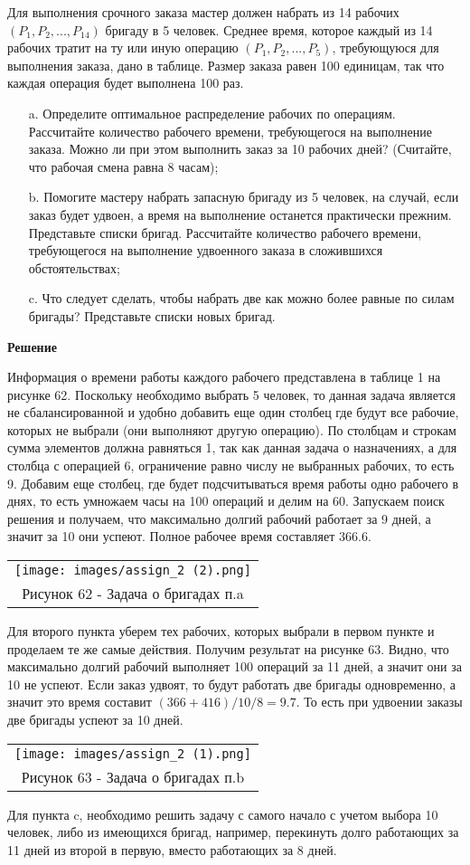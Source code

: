 \documentclass[12pt]{article}
\theoremstyle{definition}
\theoremstyle{remark}
\begin{document}
Для выполнения срочного заказа мастер должен набрать из 14 рабочих $(P_1, P_2,...,P_14)$
бригаду в 5 человек. Среднее время, которое каждый из 14 рабочих тратит на ту или
иную операцию $(P_1, P_2,...,P_5)$, требующуюся для выполнения заказа, дано в таблице.
Размер заказа равен 100 единицам, так что каждая операция будет выполнена 100 раз.
\begin{enumerate}
  \item[a.] Определите оптимальное распределение рабочих по операциям. Рассчитайте
количество рабочего времени, требующегося на выполнение заказа. Можно ли при
этом выполнить заказ за 10 рабочих дней? (Считайте, что рабочая смена равна 8
часам);
  \item[b.] Помогите мастеру набрать запасную бригаду из 5 человек, на случай, если заказ
будет удвоен, а время на выполнение останется практически прежним. Представьте
списки бригад. Рассчитайте количество рабочего времени, требующегося на
выполнение удвоенного заказа в сложившихся обстоятельствах;
  \item[c.] Что следует сделать, чтобы набрать две как можно более равные по силам
бригады? Представьте списки новых бригад.
\end{enumerate}

\textbf{Решение}

Информация о времени работы каждого рабочего представлена в таблице 1 на рисунке 62. Поскольку необходимо выбрать 5 человек, то данная задача является не сбалансированной и удобно добавить еще один столбец где будут все рабочие, которых не выбрали (они выполняют другую операцию). По столбцам и строкам сумма элементов должна равняться 1, так как данная задача о назначениях, а для столбца с операцией 6, ограничение равно числу не выбранных рабочих, то есть 9. Добавим еще столбец, где будет подсчитываться время работы одно рабочего в днях, то есть умножаем часы на 100 операций и делим на 60. Запускаем поиск решения и получаем, что максимально долгий рабочий работает за 9 дней, а значит за 10 они успеют. Полное рабочее время составляет $366.6$.
\begin{center}
  \begin{tabular}{c}
\texttt{[image: images/assign\_2 (2).png]}\\
Рисунок 62 - Задача о бригадах п.a
\end{tabular}
\end{center}

Для второго пункта уберем тех рабочих, которых выбрали в первом пункте и проделаем те же самые действия. Получим результат на рисунке 63. Видно, что максимально долгий рабочий выполняет 100 операций за 11 дней, а значит они за 10 не успеют. Если заказ удвоят, то будут работать две бригады одновременно, а значит это время составит $(366+416)/10/8=9.7$. То есть при удвоении заказы две бригады успеют за 10 дней.
\begin{center}
  \begin{tabular}{c}
\texttt{[image: images/assign\_2 (1).png]}\\
Рисунок 63 - Задача о бригадах п.b
\end{tabular}
\end{center}

Для пункта c, необходимо решить задачу с самого начало с учетом выбора 10 человек, либо из имеющихся бригад, например, перекинуть долго работающих за 11 дней из второй в первую, вместо работающих за 8 дней.
\end{document}
